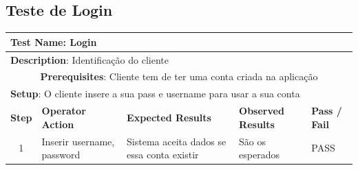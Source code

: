 \documentclass[12pt]{article} %
\begin{document}
\subsection{Teste de Login}
\begin{table}[ht!]
	\begin{tabular}{|c|p{4cm}|p{4cm}|p{3cm}|p{1cm}|}
		\hline
		\multicolumn{5}{|l|}{\textbf{Test Name}: Login}\\
		\hline
		\multicolumn{5}{|l|}{\textbf{Description}: Identificação do cliente}\\
		\hline
		\multicolumn{5}{|p{14,5cm}|}{\textbf{Prerequisites}: Cliente tem de ter uma conta criada na aplicação}\\
		\hline
		\multicolumn{5}{|l|}{\textbf{Setup}: O cliente insere a sua pass e username para usar a sua conta}\\
		\hline
		\textbf{Step} & \textbf{Operator Action} & \textbf{Expected Results} & \textbf{Observed Results} & \textbf{Pass / Fail}\\
		\hline
		1 & Inserir username, password & Sistema aceita dados se essa conta existir & São os esperados & PASS\\
		\hline
	\end{tabular}
\end{table}
\pagebreak

\end{document}
